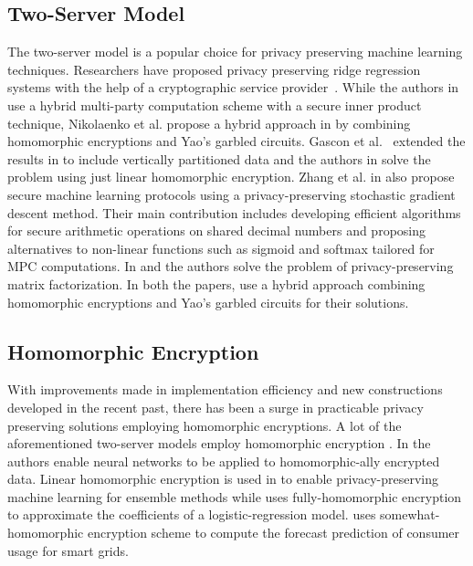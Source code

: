 \subsection{Two-Server Model}\label{app:2servermodel}
The two-server model is a popular choice for privacy preserving machine learning techniques. Researchers have proposed privacy preserving ridge regression systems with the help of a cryptographic service provider~\cite{Boneh1,LReg,Ver,Ridge2}. %
While the authors in \cite{Ridge2}  use a hybrid multi-party computation scheme with a secure inner product technique, Nikolaenko et al.  propose a hybrid approach in \cite{Boneh1} by combining homomorphic encryptions and Yao's garbled circuits. Gascon et al.~\cite{Ver} extended the results in \cite{Boneh1} to include vertically partitioned data and  the authors in \cite{LReg} solve the problem using just linear homomorphic encryption.  Zhang et al. in \cite{secureML} also propose secure machine learning protocols using a privacy-preserving stochastic gradient descent method. Their main contribution includes developing efficient algorithms for secure arithmetic operations on shared decimal numbers and proposing alternatives to non-linear functions such as sigmoid and softmax tailored for MPC computations.  In \cite{Boneh2} and \cite{Matrix2} the authors solve the problem of privacy-preserving matrix factorization. In both the papers, use a hybrid approach combining homomorphic encryptions and Yao's garbled circuits for their solutions.

\subsection{Homomorphic Encryption}\label{app:he}
With improvements made in implementation efficiency and new constructions developed in the recent past, there has been a surge in practicable privacy preserving solutions employing homomorphic encryptions. A lot of the aforementioned two-server models employ homomorphic encryption \cite{Boneh1,Boneh2,LReg,Matrix2}.   In \cite{CryptoDL,CryptoNet,NN} the authors enable neural networks to be applied to homomorphic-ally encrypted data. Linear homomorphic encryption is used in \cite{Irene2} to enable privacy-preserving machine learning for ensemble methods while %
uses  fully-homomorphic encryption
to approximate the coefficients of a logistic-regression model.
\cite{grid} uses somewhat-
homomorphic encryption scheme to compute the forecast
prediction of consumer usage for smart grids. 

